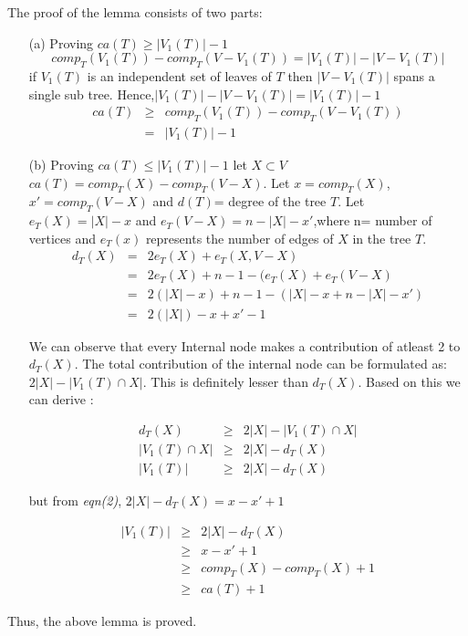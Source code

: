 \documentclass[12pt]{article}
\theoremstyle{plain}
\begin{document}
The proof of the lemma consists of two parts:
\begin{enumerate}
\item[(a)] Proving $ca(T) \geq |V_1(T)|-1$
\begin{equation}
comp_T (V_1(T)) - comp_T (V - V_1(T))=|V_1(T)|-|V-V_1(T)|
\end{equation}
if $ V_1(T)$  is an independent set of leaves of $T$ then $|V-V_1(T)|$ spans a single sub tree.
Hence,$|V_1(T)|-|V-V_1(T)| = |V_1(T)|- 1$
\begin{eqnarray}
ca(T) & \geq &comp_T (V_1(T)) - comp_T (V - V_1(T))\nonumber  \\
         &=       & |V_1(T)|- 1\nonumber
\end{eqnarray}
\item[(b)] Proving $ca(T) \leq |V_1(T)|-1$
let $X \subset V$
 $ca(T)=comp_T (X) - comp_T (V-X)$.
 Let $x=comp_T (X)$, $x'=comp_T(V-X)$ and $d(T)$= degree of the tree $T$.
 Let $e_T(X)= |X|-x$ and $e_T(V-X)=n-|X|-x'$,where n= number of vertices and $e_T (x)$ represents the number of edges of $X$ in the tree $T$.
\begin{eqnarray}
d_T (X)&=& 2e_T(X)+e_T(X,V-X)\nonumber \\ 
      &=& 2e_T(X)+n-1-(e_T(X)+e_T(V-X) \nonumber  \\
      &=&2(|X|-x)+n-1-(|X|-x+n-|X|-x') \nonumber \\
      &=&2(|X|)-x+x'-1
\end{eqnarray} 

We can observe that every Internal node makes a contribution of atleast 2 to $d_T(X)$. The total contribution of the internal node can be formulated as: $2|X| -|V_1(T) \cap X|$. This is definitely lesser than $d_T(X)$. Based on this we can derive : 

\begin{eqnarray}
d_T (X)&\geq & 2|X| -|V_1(T) \cap X| \nonumber\\
|V_1(T) \cap X| & \geq & 2|X|-d_T (X)\nonumber\\
|V_1(T)| &\geq & 2|X|-d_T (X)\nonumber
\end{eqnarray}

but from \textit{eqn(2)}, $2|X|-d_T (X)=x-x'+1$

\begin{eqnarray}
|V_1(T)| &\geq & 2|X|-d_T (X) \nonumber\\
             &\geq &x-x'+1\nonumber \\
             &\geq & comp_T (X) - comp_T (X) +1\nonumber \\
             &\geq & ca(T)+1\nonumber
\end{eqnarray}
\end{enumerate}
Thus, the above lemma is proved.
\end{document}
